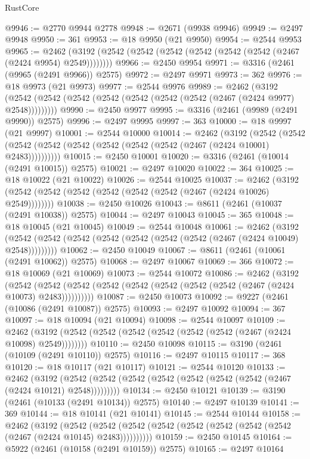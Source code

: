 \begin{lexlean}{RustCore}
\begin{coremodule}
@9946 := @2770 @9944 @2778
@9948 := @2671 (@9938 @9946)
@9949 := @2497 @9948
@9950 := 361
@9953 := @18 @9950 (@21 @9950)
@9954 := @2544 @9953
@9965 := @2462 (@3192 (@2542 (@2542 (@2542 (@2542 (@2542 (@2542 (@2467 (@2424 @9954) @2549))))))))
@9966 := @2450 @9954
@9971 := @3316 (@2461 (@9965 (@2491 @9966)) @2575)
@9972 := @2497 @9971
@9973 := 362
@9976 := @18 @9973 (@21 @9973)
@9977 := @2544 @9976
@9989 := @2462
    (@3192 (@2542 (@2542 (@2542 (@2542 (@2542 (@2542 (@2542 (@2467 (@2424 @9977) @2548)))))))))
@9990 := @2450 @9977
@9995 := @3316 (@2461 (@9989 (@2491 @9990)) @2575)
@9996 := @2497 @9995
@9997 := 363
@10000 := @18 @9997 (@21 @9997)
@10001 := @2544 @10000
@10014 := @2462
    (@3192
      (@2542 (@2542 (@2542 (@2542 (@2542 (@2542 (@2542 (@2542 (@2467 (@2424 @10001) @2483))))))))))
@10015 := @2450 @10001
@10020 := @3316 (@2461 (@10014 (@2491 @10015)) @2575)
@10021 := @2497 @10020
@10022 := 364
@10025 := @18 @10022 (@21 @10022)
@10026 := @2544 @10025
@10037 := @2462 (@3192 (@2542 (@2542 (@2542 (@2542 (@2542 (@2542 (@2467 (@2424 @10026) @2549))))))))
@10038 := @2450 @10026
@10043 := @8611 (@2461 (@10037 (@2491 @10038)) @2575)
@10044 := @2497 @10043
@10045 := 365
@10048 := @18 @10045 (@21 @10045)
@10049 := @2544 @10048
@10061 := @2462
    (@3192 (@2542 (@2542 (@2542 (@2542 (@2542 (@2542 (@2542 (@2467 (@2424 @10049) @2548)))))))))
@10062 := @2450 @10049
@10067 := @8611 (@2461 (@10061 (@2491 @10062)) @2575)
@10068 := @2497 @10067
@10069 := 366
@10072 := @18 @10069 (@21 @10069)
@10073 := @2544 @10072
@10086 := @2462
    (@3192
      (@2542 (@2542 (@2542 (@2542 (@2542 (@2542 (@2542 (@2542 (@2467 (@2424 @10073) @2483))))))))))
@10087 := @2450 @10073
@10092 := @9227 (@2461 (@10086 (@2491 @10087)) @2575)
@10093 := @2497 @10092
@10094 := 367
@10097 := @18 @10094 (@21 @10094)
@10098 := @2544 @10097
@10109 := @2462 (@3192 (@2542 (@2542 (@2542 (@2542 (@2542 (@2542 (@2467 (@2424 @10098) @2549))))))))
@10110 := @2450 @10098
@10115 := @3190 (@2461 (@10109 (@2491 @10110)) @2575)
@10116 := @2497 @10115
@10117 := 368
@10120 := @18 @10117 (@21 @10117)
@10121 := @2544 @10120
@10133 := @2462
    (@3192 (@2542 (@2542 (@2542 (@2542 (@2542 (@2542 (@2542 (@2467 (@2424 @10121) @2548)))))))))
@10134 := @2450 @10121
@10139 := @3190 (@2461 (@10133 (@2491 @10134)) @2575)
@10140 := @2497 @10139
@10141 := 369
@10144 := @18 @10141 (@21 @10141)
@10145 := @2544 @10144
@10158 := @2462
    (@3192
      (@2542 (@2542 (@2542 (@2542 (@2542 (@2542 (@2542 (@2542 (@2467 (@2424 @10145) @2483))))))))))
@10159 := @2450 @10145
@10164 := @5922 (@2461 (@10158 (@2491 @10159)) @2575)
@10165 := @2497 @10164

\end{coremodule}
\end{lexlean}
